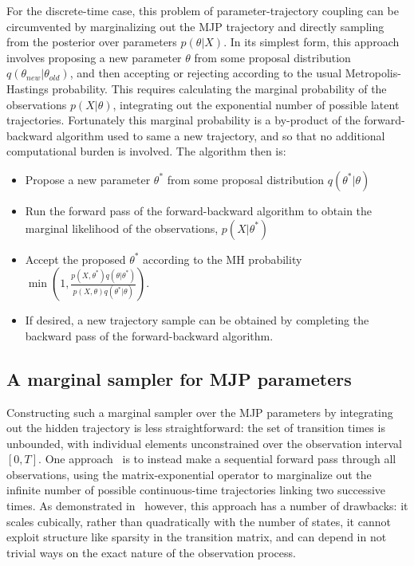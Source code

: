 For the discrete-time case, this problem of parameter-trajectory
coupling can be circumvented by marginalizing out the MJP trajectory 
and directly sampling from the posterior over parameters $p(\theta|X)$.
In its simplest form, this approach involves proposing a new parameter
$\theta$ from some proposal distribution $q(\theta_{new}|\theta_{old})$,
and then accepting or rejecting according to the usual
Metropolis-Hastings probability. This requires calculating the marginal 
probability of the observations $p(X|\theta)$, integrating out
the exponential number of possible latent trajectories. Fortunately
this marginal probability is a by-product of the forward-backward
algorithm used to same a new trajectory, and so that no 
additional computational burden is involved. The algorithm then is:
\begin{itemize}
  \item Propose a new parameter $\theta^*$ from some proposal distribution
    $q(\theta^*|\theta)$
  \item Run the forward pass of the forward-backward algorithm to 
    obtain the marginal likelihood of the observations, $p(X|\theta^*)$
  \item Accept the proposed $\theta^*$ according to the MH probability 
    $\min(1,\frac{p(X,\theta^*)q(\theta|\theta^*)}{p(X,\theta)q(\theta^*|\theta)})$.
  \item If desired, a new trajectory sample can be obtained by
    completing the backward pass of the forward-backward algorithm.
\end{itemize}

\subsection{A marginal sampler for MJP parameters} 
Constructing such a marginal sampler over the MJP parameters by
integrating out the hidden trajectory is less straightforward:
the set of transition times is unbounded, with individual elements
unconstrained over the observation interval $[0,T]$.
One approach~\cite{FearnSher2006} is to instead make a sequential 
forward pass through all observations, using the matrix-exponential
operator to marginalize out the infinite number of possible 
continuous-time trajectories linking two successive times. As
demonstrated in~\cite{RaoTeh13} however, this approach has a number of 
drawbacks: it scales cubically, rather than quadratically with the 
number of states, it cannot exploit structure like sparsity in the 
transition matrix, and can depend in not trivial ways on the exact 
nature of the observation process.

